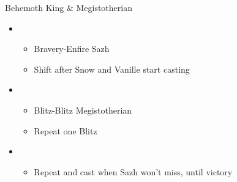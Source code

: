 \begin{multicols}{2}
\begin{battle}{Behemoth King \& Megistotherian}
\begin{itemize}
    \item \fifth
    \begin{itemize}
        \item Bravery-Enfire Sazh
        \item Shift after Snow and Vanille start casting
    \end{itemize}
    \item \second
    \begin{itemize}
        \item Blitz-Blitz Megistotherian
        \item Repeat one Blitz
    \end{itemize}
    \item \fourth
    \begin{itemize}
        \item Repeat and cast when Sazh won't miss, until victory
    \end{itemize}
\end{itemize}
\end{battle}
\end{multicols}

